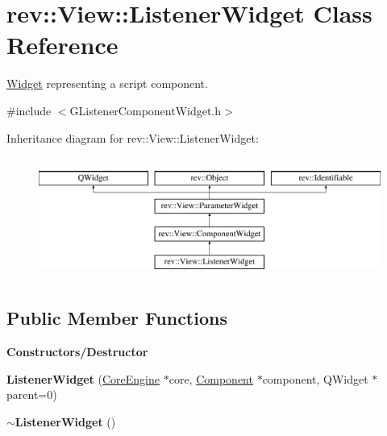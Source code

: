 \hypertarget{classrev_1_1_view_1_1_listener_widget}{}\section{rev\+::View\+::Listener\+Widget Class Reference}
\label{classrev_1_1_view_1_1_listener_widget}


\mbox{\hyperlink{class_widget}{Widget}} representing a script component.  




{\ttfamily \#include $<$G\+Listener\+Component\+Widget.\+h$>$}

Inheritance diagram for rev\+::View\+::Listener\+Widget\+:\begin{figure}[H]
\begin{center}
\leavevmode
\includegraphics[height=4.000000cm]{classrev_1_1_view_1_1_listener_widget}
\end{center}
\end{figure}
\subsection*{Public Member Functions}
\begin{Indent}\textbf{ Constructors/\+Destructor}\par
\begin{DoxyCompactItemize}
\item 
\mbox{\label{classrev_1_1_view_1_1_listener_widget_aabdd16cc75e48ff29363e0ea8090e3d4}} 
{\bfseries Listener\+Widget} (\mbox{\hyperlink{classrev_1_1_core_engine}{Core\+Engine}} $\ast$core, \mbox{\hyperlink{classrev_1_1_component}{Component}} $\ast$component, Q\+Widget $\ast$parent=0)
\item 
\mbox{\label{classrev_1_1_view_1_1_listener_widget_a3ac9ae8aa7b17945187e4ae4354f127a}} 
{\bfseries $\sim$\+Listener\+Widget} ()
\end{DoxyCompactItemize}
\end{Indent}
